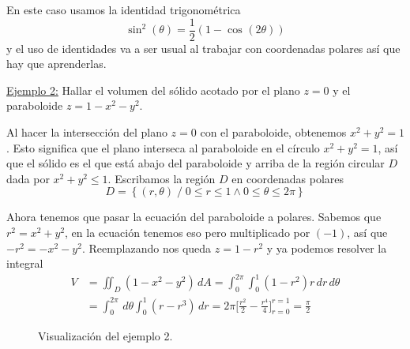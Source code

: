 \documentclass[12pt]{article}
\begin{document}
En este caso usamos la identidad trigonométrica
\[
  \sin^{2}(\theta)=\frac{1}{2}\left(1-\cos^{}(2\theta)\right)
\]
y el uso de identidades va a ser usual al trabajar con coordenadas polares así que hay que aprenderlas.

\underline{Ejemplo 2:} Hallar el volumen del sólido acotado por el plano $ z=0 $ y el paraboloide $ z=1-x^2-y^2 $.

Al hacer la intersección del plano $ z=0 $ con el paraboloide, obtenemos $ x^2+y^2=1 $. Esto significa que el plano interseca al paraboloide en el círculo $ x^2+y^2=1 $, así que el sólido es el que está abajo del paraboloide y arriba de la región circular $ D $ dada por $ x^2+y^2\leq 1 $. Escribamos la región $ D $ en coordenadas polares
\[
  D=\left\{(r,\theta) \;/\; 0\leq r\leq 1 \land 0\leq \theta\leq 2\pi\right\}
\]

Ahora tenemos que pasar la ecuación del paraboloide a polares. Sabemos que $ r^2=x^2+y^2 $, en la ecuación tenemos eso pero multiplicado por $ (-1) $, así que $ -r^2=-x^2-y^2 $. Reemplazando nos queda $ z=1-r^2 $ y ya podemos resolver la integral
\begin{align*}
  V &= \iint_{D} \left(1-x^2-y^2\right) \,dA = \int_{0}^{2\pi} \int_{0}^{1} \left(1-r^2\right)r \,dr\,d\theta\\
   &= \int_{0}^{2\pi} \,d\theta \int_{0}^{1} \left(r-r^3\right) \,dr = 2\pi\Bigg[\frac{r^2}{2}-\frac{r^4}{4}\Bigg]_{r=0}^{r=1}=\frac{\pi}{2}
\end{align*}

\begin{figure}[H]
  \centering
  {\large }

  \caption{Visualización del ejemplo 2.}
  \label{grf:integral-coord-polar-ej2}
\end{figure}
\end{document}
